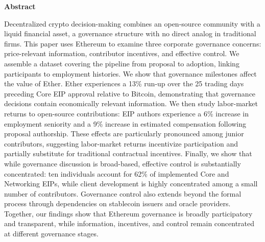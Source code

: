 \documentclass[No]{AEA}
\begin{document}
\clearpage

\begin{titlingpage}


\emptythanks
\author{}

\maketitle

\begin{center}
    \textbf{Abstract}\\
\end{center}


\begin{singlespace}
Decentralized crypto decision-making combines an open-source community with a liquid financial asset, a governance structure with no direct analog in traditional firms. This paper uses Ethereum to examine three corporate governance concerns: price-relevant information, contributor incentives, and effective control. We assemble a dataset covering the pipeline from proposal to adoption, linking participants to employment histories. We show that governance milestones affect the value of Ether. Ether experiences a 13\% run-up over the 25 trading days preceding Core EIP approval relative to Bitcoin, demonstrating that governance decisions contain economically relevant information. We then study labor-market returns to open-source contributions: EIP authors experience a 6\% increase in employment seniority and a 9\% increase in estimated compensation following proposal authorship. These effects are particularly pronounced among junior contributors, suggesting labor-market returns incentivize participation and partially substitute for traditional contractual incentives. Finally, we show that while governance discussion is broad-based, effective control is substantially concentrated: ten individuals account for 62\% of implemented Core and Networking EIPs, while client development is highly concentrated among a small number of contributors. Governance control also extends beyond the formal process through dependencies on stablecoin issuers and oracle providers. Together, our findings show that Ethereum governance is broadly participatory and transparent, while information, incentives, and control remain concentrated at different governance stages.
\end{singlespace}


\clearpage
 \end{titlingpage}
\end{document}
